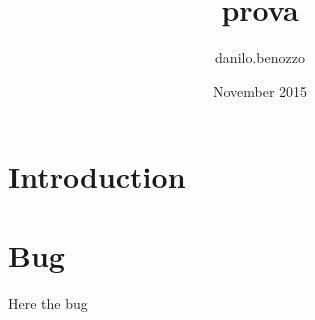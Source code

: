 \documentclass{article}
\title{prova}
\author{danilo.benozzo }
\date{November 2015}
\begin{document}
\maketitle

\section{Introduction}


\section{Bug}
Here the bug
\end{document}
